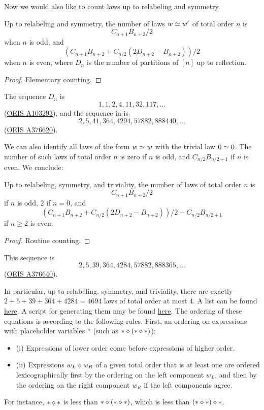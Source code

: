 Now we would also like to count laws up to relabeling and symmetry.

\begin{lemma}\label{law-count-sym}
  Up to relabeling and symmetry, the number of laws $w \simeq w'$ of total order $n$ is
  $$ C_{n+1} B_{n+2}/2$$
  when $n$ is odd, and
  $$ (C_{n+1} B_{n+2} + C_{n/2} (2D_{n+2} - B_{n+2}))/2$$
  when $n$ is even, where $D_n$ is the number of partitions of $[n]$ up to reflection.
\end{lemma}

\begin{proof}
  Elementary counting.
\end{proof}

The sequence $D_n$ is
$$ 1, 1, 2, 4, 11, 32, 117, \dots$$
(\href{https://oeis.org/A103293}{OEIS A103293}), and the sequence in  is
$$ 2, 5, 41, 364, 4294, 57882, 888440, \dots$$
(\href{https://oeis.org/A376620}{OEIS A376620}).

We can also identify all laws of the form $w \simeq w$ with the trivial law $0 \simeq 0$. The number of such laws of total order $n$ is zero if $n$ is odd, and $C_{n/2} B_{n/2+1}$ if $n$ is even. We conclude:

\begin{lemma}\label{law-count-triv}
  Up to relabeling, symmetry, and triviality, the number of laws of total order $n$ is
  $$ C_{n+1} B_{n+2}/2$$
  if $n$ is odd, $2$ if $n = 0$, and
  $$ (C_{n+1} B_{n+2} + C_{n/2} (2D_{n+2} - B_{n+2}))/2 - C_{n/2} B_{n/2+1}$$
  if $n \geq 2$ is even.
\end{lemma}

\begin{proof}
  Routine counting.
\end{proof}

This sequence is
$$2, 5, 39, 364, 4284, 57882, 888365, \dots$$
(\href{https://oeis.org/A376640}{OEIS A376640}).

In particular, up to relabeling, symmetry, and triviality, there are exactly $2+5+39+364+4284=4694$ laws of total order at most $4$. A list can be found \href{https://github.com/teorth/equational_theories/blob/main/data/equations.txt}{here}. A script for generating them may be found \href{https://github.com/teorth/equational_theories/blob/main/scripts/generate_eqs_list.py}{here}. The ordering of these equations is according to the following rules.
First, an ordering on expressions with placeholder variables $\ast$ (such as $\ast \diamond (\ast \diamond \ast)$):
\begin{itemize}
\item (i)  Expressions of lower order come before expressions of higher order.
\item (ii) Expressions $w_L \diamond w_R$ of a given total order that is at least one are ordered lexicographically first by the ordering on the left component $w_L$, and then by the ordering on the right component $w_R$ if the left components agree.
\end{itemize}
For instance, $\ast \diamond \ast$ is less than $\ast \diamond (\ast \diamond \ast)$, which is less than $(\ast \diamond \ast) \diamond \ast$.

